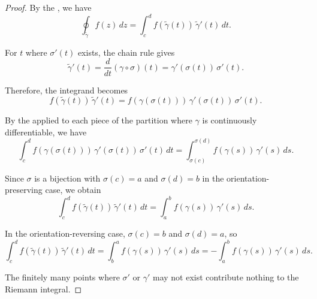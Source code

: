 \begin{proof}
    By the , we have
    $$\oint_{\tilde{\gamma}} f(z)\,dz = \int_c^d f(\tilde{\gamma}(t))\,\tilde{\gamma}'(t)\,dt.$$

    For $t$ where $\sigma'(t)$ exists, the chain rule gives
    $$\tilde{\gamma}'(t) = \frac{d}{dt}(\gamma \circ \sigma)(t) = \gamma'(\sigma(t))\,\sigma'(t).$$

    Therefore, the integrand becomes
    $$f(\tilde{\gamma}(t))\,\tilde{\gamma}'(t) = f(\gamma(\sigma(t)))\,\gamma'(\sigma(t))\,\sigma'(t).$$

    By the  applied to each piece of the partition where $\gamma$ is continuously differentiable, we have
    $$\int_c^d f(\gamma(\sigma(t)))\,\gamma'(\sigma(t))\,\sigma'(t)\,dt = \int_{\sigma(c)}^{\sigma(d)} f(\gamma(s))\,\gamma'(s)\,ds.$$

    Since $\sigma$ is a bijection with $\sigma(c) = a$ and $\sigma(d) = b$ in the orientation-preserving case, we obtain
    $$\int_c^d f(\tilde{\gamma}(t))\,\tilde{\gamma}'(t)\,dt = \int_a^b f(\gamma(s))\,\gamma'(s)\,ds.$$

    In the orientation-reversing case, $\sigma(c) = b$ and $\sigma(d) = a$, so
    $$\int_c^d f(\tilde{\gamma}(t))\,\tilde{\gamma}'(t)\,dt = \int_b^a f(\gamma(s))\,\gamma'(s)\,ds = -\int_a^b f(\gamma(s))\,\gamma'(s)\,ds.$$

    The finitely many points where $\sigma'$ or $\gamma'$ may not exist contribute nothing to the Riemann integral.
\end{proof}
